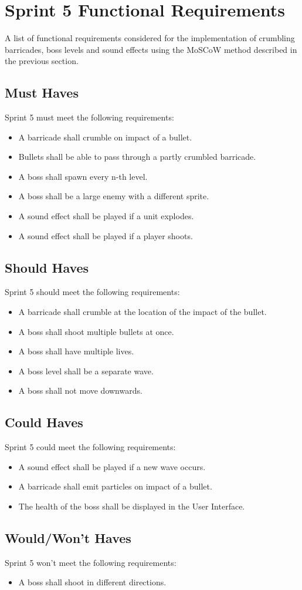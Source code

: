 \section{Sprint 5 Functional Requirements}

A list of functional requirements considered for the implementation of crumbling barricades, boss levels and sound effects using the MoSCoW method described in the previous section.

\subsection{Must Haves}
Sprint 5 must meet the following requirements:
\begin{itemize}
	\item A barricade shall crumble on impact of a bullet.
	\item Bullets shall be able to pass through a partly crumbled barricade. 
	\item A boss shall spawn every n-th level.
	\item A boss shall be a large enemy with a different sprite.
	\item A sound effect shall be played if a unit explodes.
	\item A sound effect shall be played if a player shoots.
\end{itemize}

\subsection{Should Haves}
Sprint 5 should meet the following requirements:
\begin{itemize}
	\item A barricade shall crumble at the location of the impact of the bullet.
	\item A boss shall shoot multiple bullets at once.
	\item A boss shall have multiple lives.
	\item A boss level shall be a separate wave.
	\item A boss shall not move downwards.
\end{itemize}

\subsection{Could Haves}
Sprint 5 could meet the following requirements:
\begin{itemize}
	\item A sound effect shall be played if a new wave occurs.
	\item A barricade shall emit particles on impact of a bullet.
	\item The health of the boss shall be displayed in the User Interface.
\end{itemize}

\subsection{Would/Won't Haves}
Sprint 5 won't meet the following requirements:
\begin{itemize}
	\item A boss shall shoot in different directions.
\end{itemize}
